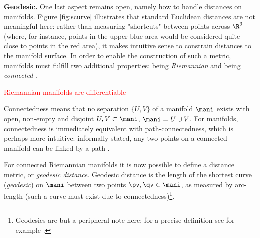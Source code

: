 \textbf{Geodesic.} One last aspect remains open, namely how to handle distances 
on manifolds.
Figure \ref{fig:scurve} illustrates that standard Euclidean distances are not
meaningful here: rather than measuring "shortcuts" between points across 
$\R^3$ (where, for instance, points in the upper blue area would be considered
quite close to points in the red area), it makes intuitive sense to constrain 
distances to the manifold surface.
In order to enable the construction of such a metric, manifolds must fulfill
two additional properties: being \textit{Riemannian} and being 
\textit{connected} \citep{mafu2011}.

\textcolor{red}{Riemannian manifolds are differentiable}

Connectedness means that no separation $\{ U, V\}$ of a manifold $\mani$
exists with open, non-empty and disjoint $U, V \subset \mani$, 
$\mani = U \cup V$.
For manifolds, connectedness is immediately equivalent with path-connectedness,
which is perhaps more intuitive: informally stated, any two points on a 
connected manifold can be linked by a path
\citep{mccleary2006}.

For connected Riemannian manifolds it is now possible to define a distance 
metric, or \textit{geodesic distance}.
Geodesic distance is the length of the shortest curve (\textit{geodesic}) on
$\mani$ between two points $\pv, \qv \in \mani$, as measured by arc-length (such 
a curve must exist due to connectedness)\footnote{
Geodesics are but a peripheral note here; for a precise definition see for 
example \citet{mafu2011}.
}.


% 

